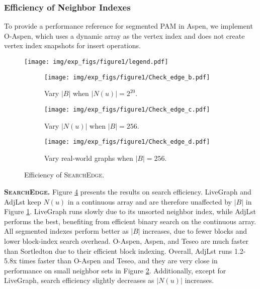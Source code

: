 \subsubsection{Efficiency of Neighbor Indexes} \label{sec:effiency_of_neighbor_indexes}

To provide a performance reference for segmented PAM in Aspen, we implement O-Aspen, which uses a dynamic array as the vertex index and does not create vertex index snapshots for insert operations.

\begin{figure}[h!]
	\setlength{\abovecaptionskip}{0pt}
	\setlength{\belowcaptionskip}{-2pt}
		\captionsetup[subfigure]{aboveskip=0pt,belowskip=0pt}
	\centering
    \texttt{[image: img/exp\_figs/figure1/legend.pdf]}\\
	\begin{subfigure}[t]{0.30\textwidth}
		\centering
		\texttt{[image: img/exp\_figs/figure1/Check\_edge\_b.pdf]}
		\caption{Vary $|B|$ when $|N(u)| = 2 ^ {20}$.}
		\label{fig:search_vary_block_size}
	\end{subfigure}
    \begin{subfigure}[t]{0.30\textwidth}
		\centering
		\texttt{[image: img/exp\_figs/figure1/Check\_edge\_c.pdf]}
		\caption{Vary $|N(u)|$ when $|B| = 256$.}
		\label{fig:search_vary_neighbor_set_size}
	\end{subfigure}
    \begin{subfigure}[t]{0.60\textwidth}
		\centering
		\texttt{[image: img/exp\_figs/figure1/Check\_edge\_d.pdf]}
		\caption{Vary real-world graphs when $|B| = 256$.}
		\label{fig:search_vary_graphs}
	\end{subfigure}
    
	\caption{Efficiency of \textsc{SearchEdge}.}
	\label{fig:search}
\end{figure}

\noindent\textbf{\textsc{SearchEdge}.} Figure \ref{fig:search} presents the results on search efficiency. LiveGraph and AdjLst keep $N(u)$ in a continuous array and are therefore unaffected by $|B|$ in Figure \ref{fig:search_vary_block_size}. LiveGraph runs slowly due to its unsorted neighbor index, while AdjLst performs the best, benefiting from efficient binary search on the continuous array. All segmented indexes perform better as $|B|$ increases, due to fewer blocks and lower block-index search overhead. O-Aspen, Aspen, and Teseo are much faster than Sortledton due to their efficient block indexing. Overall, AdjLst runs 1.2-5.8x times faster than O-Aspen and Teseo, and they are very close in performance on small neighbor sets in Figure \ref{fig:search_vary_neighbor_set_size}. Additionally, except for LiveGraph, search efficiency slightly decreases as $|N(u)|$ increases.

